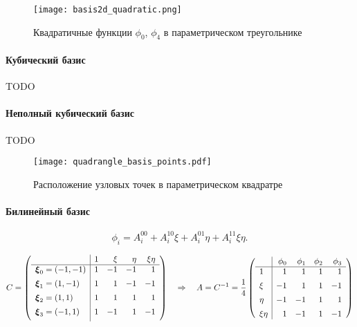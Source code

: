 \begin{figure}[h!]
\centering
\texttt{[image: basis2d\_quadratic.png]}
\caption{Квадратичные функции $\phi_0$, $\phi_4$ в параметрическом треугольнике}
\label{fig:basis2d_quadratic}
\end{figure}

\paragraph{Кубический базис}
TODO

\paragraph{Неполный кубический базис}
TODO

\begin{figure}[h!]
\centering
\texttt{[image: quadrangle\_basis\_points.pdf]}
\caption{Расположение узловых точек в параметрическом квадратре}
\label{fig:quadrangle_basis_points}
\end{figure}

\paragraph{Билинейный базис}
\begin{equation*}
\phi_i = A^{00}_i + A^{10}_i \xi + A^{01}_i \eta + A^{11}_i \xi\eta.
\end{equation*}

\begin{equation*}
C = \left(
\begin{array}{l|rrrr}
                      & 1 & \xi & \eta & \xi\eta \\
\hline
\boldsymbol{\rm \xi}_0 = (-1, -1) & 1 & -1  & -1   &  1      \\[5pt] 
\boldsymbol{\rm \xi}_1 = ( 1, -1) & 1 &  1  & -1   & -1      \\[5pt]
\boldsymbol{\rm \xi}_2 = ( 1,  1) & 1 &  1  &  1   &  1      \\[5pt]
\boldsymbol{\rm \xi}_3 = (-1,  1) & 1 & -1  &  1   & -1      \\[5pt]
\end{array}
\right)
\quad\Rightarrow\quad
A = C^{-1} = \frac14\left(
\begin{array}{l|rrrr}
        & \phi_0 & \phi_1 & \phi_2 & \phi_3\\
\hline
1       & 1 & 1 & 1 & 1\\[5pt]
\xi     & -1 & 1 & 1 & -1\\[5pt]
\eta    & -1 & -1 & 1 & 1\\[5pt]
\xi\eta & 1 & -1 & 1 & -1
\end{array}
\right)
\end{equation*}

